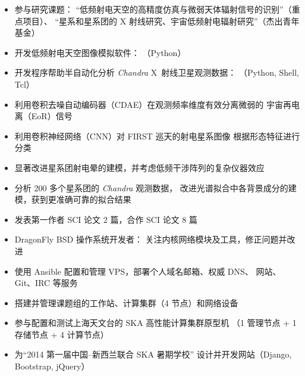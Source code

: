\documentclass[zh]{resume}
\begin{document}
\begin{itemize}
  \item 参与研究课题：
    \enquote{低频射电天空的高精度仿真与微弱天体辐射信号的识别}（重点项目）、
    \enquote{星系和星系团的 X 射线研究、宇宙低频射电辐射研究}（杰出青年基金）
  \item 开发低频射电天空图像模拟软件：
    （Python）
  \item 开发程序帮助半自动化分析 \textit{Chandra} X~射线卫星观测数据：
    （Python, Shell, Tcl）
  \item 利用卷积去噪自动编码器（CDAE）在观测频率维度有效分离微弱的
    宇宙再电离（EoR）信号
  \item 利用卷积神经网络（CNN）对 FIRST 巡天的射电星系图像
    根据形态特征进行分类
  \item 显著改进星系团射电晕的建模，并考虑低频干涉阵列的复杂仪器效应
  \item 分析 200 多个星系团的 \textit{Chandra} 观测数据，
    改进光谱拟合中各背景成分的建模，获到更准确可靠的拟合结果
  \item 发表第一作者 SCI 论文 2 篇，合作 SCI 论文 8 篇
\end{itemize}

\begin{itemize}
  \item DragonFly BSD 操作系统开发者：
    关注内核网络模块及工具，修正问题并改进
  \item 使用 Ansible 配置和管理 VPS，部署个人域名邮箱、权威 DNS、
    网站、Git、IRC 等服务
  \item 搭建并管理课题组的工作站、计算集群（4 节点）和网络设备
  \item 参与配置和测试上海天文台的 SKA 高性能计算集群原型机
    （1 管理节点 + 1 存储节点 + 4 计算节点）
  \item 为\enquote{2014 第一届中国--新西兰联合 SKA 暑期学校}
    设计并开发网站（Django, Bootstrap, jQuery）
\end{itemize}
\end{document}
